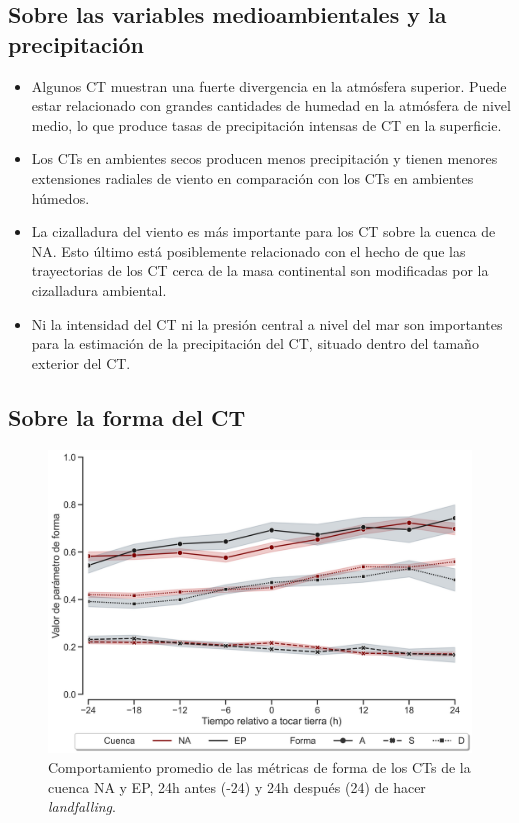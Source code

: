 \subsection{Sobre las variables medioambientales y la precipitación}
\begin{frame}
\begin{itemize}
    \item Algunos CT muestran una fuerte divergencia en la atmósfera superior. Puede estar relacionado con grandes cantidades de humedad en la atmósfera de nivel medio, lo que produce tasas de precipitación intensas de CT en la superficie.

    \item Los CTs en ambientes secos producen menos precipitación y tienen menores extensiones radiales de viento en comparación con los CTs en ambientes húmedos.

    \item La cizalladura del viento es más importante para los CT sobre la cuenca de {\red NA}. Esto último está posiblemente relacionado con el hecho de que las trayectorias de los CT cerca de la masa continental son modificadas por la cizalladura ambiental.

    \item Ni la intensidad del CT ni la presión central a nivel del mar son importantes para la estimación de la precipitación del CT, situado dentro del tamaño exterior del CT.
\end{itemize}
\end{frame}

\subsection{Sobre la forma del CT}
\begin{frame}
\begin{figure}
    \centering
    \includegraphics[scale = 0.3]{Images/Figures/Fig_3_32.jpeg}
    \caption{Comportamiento promedio de las métricas de forma de los CTs de la cuenca {\red NA} y {\gray EP}, 24h antes (-24) y 24h después (24) de hacer \textit{landfalling}.}
    \label{fig:fig_10}
\end{figure}
\end{frame}